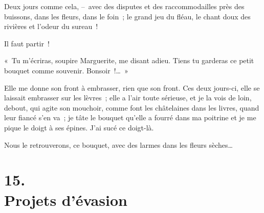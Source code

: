 \documentclass[french,twoside]{book} %
\begin{document}
Deux jours comme cela, – avec des disputes et des raccommodailles près des buissons, dans les fleurs, dans le foin ; le grand jeu du fléau, le chant doux des rivières et l’odeur du sureau !\par
\bigbreak
\noindent Il faut partir !\par
\bigbreak
\noindent « Tu m’écriras, soupire Marguerite, me disant adieu. Tiens tu garderas ce petit bouquet comme souvenir. Bonsoir !… »\par
Elle me donne son front à embrasser, rien que son front. Ces deux jours-ci, elle se laissait embrasser sur les lèvres ; elle a l’air toute sérieuse, et je la vois de loin, debout, qui agite son mouchoir, comme font les châtelaines dans les livres, quand leur fiancé s’en va ; je tâte le bouquet qu’elle a fourré dans ma poitrine et je me pique le doigt à ses épines. J’ai sucé ce doigt-là.\par
Nous le retrouverons, ce bouquet, avec des larmes dans les fleurs sèches…
\section[{15. Projets d’évasion}]{15. \\
Projets d’évasion}\renewcommand{\leftmark}{15. \\
Projets d’évasion}
\end{document}
